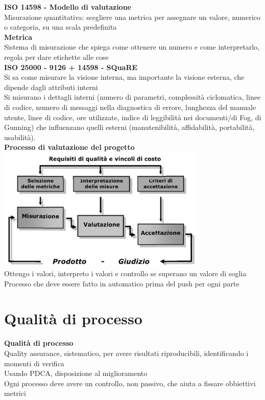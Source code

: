 \documentclass{article}
\begin{document}
		\textbf{ISO 14598 - Modello di valutazione}\\
		Misurazione quantitativa: scegliere una metrica per assegnare un valore, numerico o categoria, su una scala predefinita\\
		
		\textbf{Metrica}\\
		Sistema di misurazione che spiega come ottenere un numero e come interpretarlo, regola per dare etichette alle cose\\
		
		\textbf{ISO 25000 - 9126 + 14598 - SQuaRE}\\
		Si sa come misurare la visione interna, ma importante la visione esterna, che dipende dagli attributi interni\\
		Si misurano i dettagli interni (numero di parametri, complessità ciclomatica, linee di codice, numero di messaggi nella diagnostica di errore, lunghezza del manuale utente, linee di codice, ore utilizzate, indice di leggibilità nei documenti/di Fog, di Gunning) che influenzano quelli esterni (manutenibilità, affidabilità, portabilità, usabilità).\\
		 
		 \textbf{Processo di valutazione del progetto}\\
		 \includegraphics[width=10cm]{processo_valutazione.jpg}\\
		 Ottengo i valori, interpreto i valori e controllo se superano un valore di soglia\\
		 Processo che deve essere fatto in automatico prima del push per ogni parte
		 
		 \clearpage
		 \section{Qualità di processo}
		
		\textbf{Qualità di processo}\\
		Quality assurance, sistematico, per avere risultati riproducibili, identificando i momenti di verifica\\
		Usando PDCA, disposizione al miglioramento\\
		Ogni processo deve avere un controllo, non passivo, che aiuta a fissare obbiettivi metrici\\
		
\end{document}
